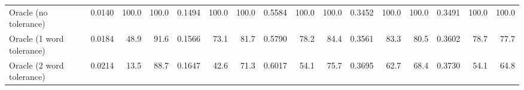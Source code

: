 \begin{table}[t]
\begin{adjustbox}{max width=\linewidth}
\begin{tabular}{lrrrrrrrrrrrrrrr}
        Oracle (no tolerance) & 0.0140 & 100.0 & 100.0 & 0.1494 & 100.0 & 100.0 & 0.5584 & 100.0 & 100.0 & 0.3452 & 100.0 & 100.0 & 0.3491 & 100.0 & 100.0 \\
        Oracle (1 word tolerance) & 0.0184 & 48.9 & 91.6 & 0.1566 & 73.1 & 81.7 & 0.5790 & 78.2 & 84.4 & 0.3561 & 83.3 & 80.5 & 0.3602 & 78.7 & 77.7 \\
        Oracle (2 word tolerance) & 0.0214 & 13.5 & 88.7 & 0.1647 & 42.6 & 71.3 & 0.6017 & 54.1 & 75.7 & 0.3695 & 62.7 & 68.4 & 0.3730 & 54.1 & 64.8 \\
        \bottomrule
    \end{tabular}
    \end{adjustbox}
\end{table}
